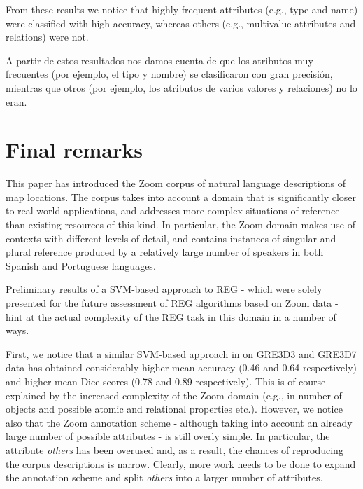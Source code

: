 From these results we notice that highly frequent attributes (e.g., type and name) were classified  with high accuracy, whereas others (e.g., multivalue attributes and relations) were not. 

A partir de estos resultados nos damos cuenta de que los atributos muy frecuentes (por ejemplo, el tipo y nombre) se clasificaron con gran precisi\'on, mientras que otros (por ejemplo, los atributos de varios valores y relaciones) no lo eran.

\section{Final remarks}
\label{sec-final}

This paper has introduced the Zoom corpus of natural language descriptions of map locations. The corpus takes into account a domain that is significantly closer to real-world applications, and addresses more complex situations of reference than existing resources of this kind. In particular, the Zoom domain makes use of  contexts with different levels of detail, and contains instances of singular and plural reference produced by a relatively large number of speakers in both Spanish and Portuguese languages.

Preliminary results of a SVM-based approach to REG - which were solely presented for the future assessment of REG algorithms based on Zoom data - hint at the actual complexity of the REG task in this domain in a number of ways. 

First, we notice that a similar SVM-based approach in \cite{thiago-svm} on GRE3D3 and GRE3D7 data has obtained considerably higher mean accuracy (0.46 and 0.64 respectively) and higher mean Dice scores (0.78 and 0.89 respectively). This is of course explained by the increased complexity of the Zoom domain (e.g., in number of objects and possible atomic and relational properties etc.). However, we notice also that the Zoom annotation scheme - although taking into account an already large number of possible attributes - is still overly simple. In particular, the attribute {\em others} has been overused and, as a result, the chances of reproducing the corpus descriptions is narrow. Clearly, more work needs to be done to expand the annotation scheme and split {\em others} into a larger number of attributes.

